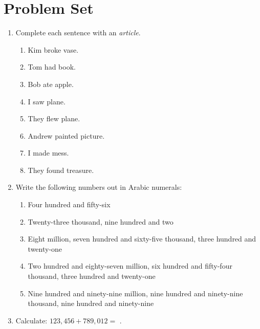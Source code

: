 \documentclass{tufte-book}
\begin{document}
\clearpage\section{Problem Set }

\begin{enumerate}
  \item Complete each sentence with an \emph{article}.
  \begin{multicols}{2}
  \begin{enumerate}
    \item Kim broke \dotfill vase.\bigskip
    \item Tom had \dotfill book.\bigskip
    \item Bob ate \dotfill apple.\bigskip
    \item I saw \dotfill plane.
    \item They flew \dotfill plane.\bigskip
    \item Andrew painted \dotfill picture.\bigskip
    \item I made \dotfill mess.\bigskip
    \item They found \dotfill treasure.
  \end{enumerate}
  \end{multicols}

  \item Write the following numbers out in Arabic numerals:
  \begin{enumerate}
    \item Four hundred and fifty-six\bigskip\par\dotfill\bigskip
    \item Twenty-three thousand, nine hundred and two\bigskip\par\dotfill\bigskip
    \item Eight million, seven hundred and sixty-five thousand, three hundred and twenty-one\bigskip\par\dotfill\bigskip
    \item Two hundred and eighty-seven million, six hundred and fifty-four thousand, three hundred and twenty-one\bigskip\par\dotfill\bigskip
    \item Nine hundred and ninety-nine million, nine hundred and ninety-nine thousand, nine hundred and ninety-nine\bigskip\par\dotfill\bigskip
  \end{enumerate}

  \item Calculate: $123,456 + 789,012 =$ \dotfill.
\end{enumerate}
\end{document}
